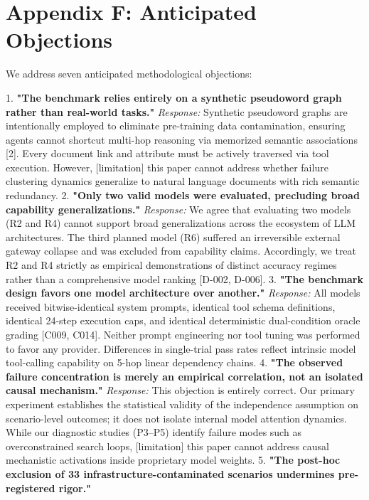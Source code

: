 \documentclass[11pt,letterpaper]{article}
\begin{document}
\section*{Appendix F: Anticipated Objections}

We address seven anticipated methodological objections:

1. \textbf{"The benchmark relies entirely on a synthetic pseudoword graph rather than real-world tasks."}  
   \emph{Response:} Synthetic pseudoword graphs are intentionally employed to eliminate pre-training data contamination, ensuring agents cannot shortcut multi-hop reasoning via memorized semantic associations [2]. Every document link and attribute must be actively traversed via tool execution. However, [limitation] this paper cannot address whether failure clustering dynamics generalize to natural language documents with rich semantic redundancy.
2. \textbf{"Only two valid models were evaluated, precluding broad capability generalizations."}  
   \emph{Response:} We agree that evaluating two models (R2 and R4) cannot support broad generalizations across the ecosystem of LLM architectures. The third planned model (R6) suffered an irreversible external gateway collapse and was excluded from capability claims. Accordingly, we treat R2 and R4 strictly as empirical demonstrations of distinct accuracy regimes rather than a comprehensive model ranking [D-002, D-006].
3. \textbf{"The benchmark design favors one model architecture over another."}  
   \emph{Response:} All models received bitwise-identical system prompts, identical tool schema definitions, identical 24-step execution caps, and identical deterministic dual-condition oracle grading [C009, C014]. Neither prompt engineering nor tool tuning was performed to favor any provider. Differences in single-trial pass rates reflect intrinsic model tool-calling capability on 5-hop linear dependency chains.
4. \textbf{"The observed failure concentration is merely an empirical correlation, not an isolated causal mechanism."}  
   \emph{Response:} This objection is entirely correct. Our primary experiment establishes the statistical validity of the independence assumption on scenario-level outcomes; it does not isolate internal model attention dynamics. While our diagnostic studies (P3–P5) identify failure modes such as overconstrained search loops, [limitation] this paper cannot address causal mechanistic activations inside proprietary model weights.
5. \textbf{"The post-hoc exclusion of 33 infrastructure-contaminated scenarios undermines pre-registered rigor."}  
\end{document}
